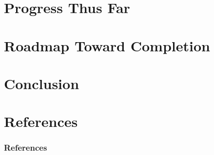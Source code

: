 \documentclass{beamer}
\begin{document}
\section{Progress Thus Far}


\section{Roadmap Toward Completion}


\section{Conclusion}


\section{References}

\begin{frame}[allowframebreaks]
\frametitle{References}




\end{frame}

\end{document}

